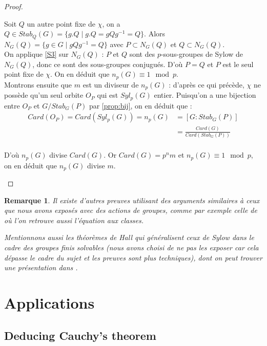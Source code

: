 \documentclass{article}
\theoremstyle{definition}
\theoremstyle{plain}
\theoremstyle{plain}
\theoremstyle{plain}
\theoremstyle{plain}
\newtheorem{remark}[subsubsection]{Remarque}
\theoremstyle{definition}
\theoremstyle{plain}
\theoremstyle{plain}
\begin{document}
\begin{proof}
\begin{enumerate}[label={\upshape(\roman*)}]
Soit \( Q \) un autre point fixe de \( \chi \), on a \(Q \in Stab_Q(G) = \{g.Q \mid g.Q = gQg^{-1} = Q \}  \). Alors \( N_G(Q) = \{ g \in G \mid gQg^{-1} = Q\} \) avec \( P \subset N_G(Q) \) et \( Q \subset N_G(Q) \). \\
On applique \ref{S3} sur \( N_G(Q) \) : \( P \) et \( Q \) sont des \(p\)-sous-groupes de Sylow de \( N_G(Q) \), donc ce sont des sous-groupes conjugués. D'où \( P = Q \) et \( P \) est le seul point fixe de \( \chi \). On en déduit que \( n_p(G) \equiv 1 \mod p \). \\
Montrons ensuite que \( m \) est un diviseur de \( n_p(G) \) : d'après ce qui précède, \( \chi \) ne possède qu'un seul orbite \( O_P \) qui est \( Syl_p({G}) \) entier. Puisqu'on a une bijection entre \( O_P \) et \( G/Stab_G(P) \) par \ref{prop:bij}, on en déduit que :
\begin{align*}
	Card(O_P)= Card(Syl_p(G)) = n_p(G) &= [G : Stab_G(P) ] \\ 
		 &= \frac{Card(G)}{Card(Stab_G(P))}\\
\end{align*}

D'où \( n_p(G) \) divise \( Card(G) \). Or \( Card(G) = p^{n}m \) et \( n_p(G) \equiv 1\mod p \), on en déduit que \( n_p(G) \) divise \( m \).
	\end{enumerate}
\end{proof}

\begin{remark}
	Il existe d'autres preuves utilisant des arguments similaires à ceux que nous avons exposés avec des actions de groupes, comme par exemple celle de \cite[p.~ 140-141]{dummit2003abstract} où l'on retrouve aussi l'équation aux classes.

	Mentionnons aussi les théorèmes de Hall qui généralisent ceux de Sylow dans le cadre des groupes finis solvables (nous avons choisi de ne pas les exposer car cela dépasse le cadre du sujet et les preuves sont plus techniques), dont on peut trouver une présentation dans \cite[p.~ 40-44]{serre1979ens}.
\end{remark}

\section{Applications}

\subsection{Deducing Cauchy's theorem}
\end{document}

